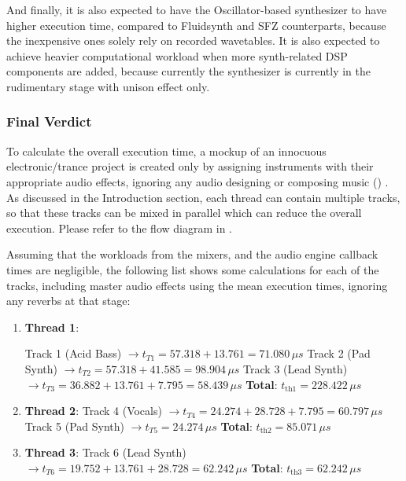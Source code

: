And finally, it is also expected to have the Oscillator-based synthesizer to have higher execution time, compared
to Fluidsynth and SFZ counterparts, because the inexpensive ones solely rely on recorded wavetables. It is also expected
to achieve heavier computational workload when more synth-related DSP components are added, because currently the synthesizer
is currently in the rudimentary stage with unison effect only.

\subsubsection{Final Verdict}
To calculate the overall execution time, a mockup of an innocuous electronic/trance project is created only by assigning instruments 
with their appropriate audio effects, ignoring any audio designing or composing music () \cite{openai_chatgpt}. 
As discussed in the Introduction section, each thread can contain multiple tracks, 
so that these tracks can be mixed in parallel which can reduce the overall execution. Please refer to the flow diagram in 
.



Assuming that the workloads from the mixers, and the audio engine callback times are negligible,
the following list shows some calculations for each of the tracks, including master audio effects using the mean
execution times, ignoring any reverbs at that stage:

\pagebreak

\begin{enumerate}
    \item \textbf{Thread 1}:

        \subitem Track 1 (Acid Bass) $\rightarrow t_{T1} = 57.318 + 13.761 = 71.080\,\mu s$
        \subitem Track 2 (Pad Synth) $\rightarrow t_{T2} = 57.318 + 41.585 = 98.904\,\mu s$
        \subitem Track 3 (Lead Synth) $\rightarrow t_{T3} = 36.882 + 13.761 + 7.795 = 58.439\,\mu s$
        \subitem \textbf{Total}: $t_\text{th1} = 228.422\,\mu s$

    \item \textbf{Thread 2}:
        \subitem Track 4 (Vocals) $\rightarrow t_{T4} = 24.274 + 28.728 + 7.795 = 60.797\,\mu s$
        \subitem Track 5 (Pad Synth) $\rightarrow t_{T5} = 24.274\,\mu s$
        \subitem \textbf{Total}: $t_\text{th2} = 85.071\,\mu s$
    
    \item \textbf{Thread 3}:
        \subitem Track 6 (Lead Synth) $\rightarrow t_{T6} = 19.752 + 13.761 + 28.728 = 62.242\,\mu s$
        \subitem \textbf{Total}: $t_\text{th3} = 62.242\,\mu s$
        
\end{enumerate}

